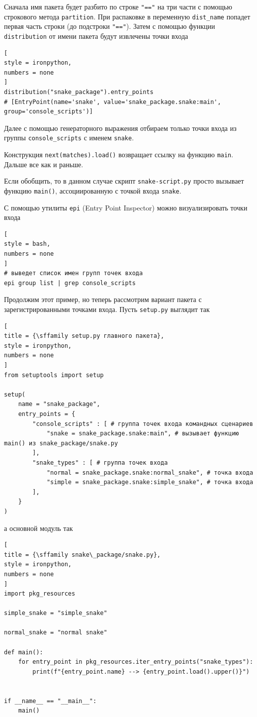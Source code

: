\documentclass[%
	11pt,
	a4paper,
	utf8,
		]{article}
\begin{document}
Сначала имя пакета будет разбито по строке \verb|"=="| на три части с помощью строкового метода \texttt{partition}. При распаковке в переменную \texttt{dist\_name} попадет первая часть строки (до подстроки \verb|"=="|). Затем с помощью функции \texttt{distribution} от имени пакета будут извлечены точки входа
\begin{lstlisting}[
style = ironpython,
numbers = none	
]
distribution("snake_package").entry_points
# [EntryPoint(name='snake', value='snake_package.snake:main', group='console_scripts')]
\end{lstlisting}

Далее с помощью генераторного выражения отбираем только точки входа из группы \texttt{console\_scripts} с именем \texttt{snake}.

Конструкция \texttt{next(matches).load()} возвращает ссылку на функцию \texttt{main}. Дальше все как и раньше.

Если обобщить, то в данном случае скрипт \texttt{snake-script.py} просто вызывает функцию \texttt{main()}, ассоциированную с точкой входа \texttt{snake}.


С помощью утилиты \texttt{epi} (Entry Point Inspector) можно визуализировать точки входа
\begin{lstlisting}[
style = bash,
numbers = none	
]
# выведет список имен групп точек входа
epi group list | grep console_scripts
\end{lstlisting}

Продолжим этот пример, но теперь рассмотрим вариант пакета с зарегистрированными точками входа. Пусть \texttt{setup.py} выглядит так
\begin{lstlisting}[
title = {\sffamily setup.py главного пакета},
style = ironpython,
numbers = none	
]
from setuptools import setup

setup(
    name = "snake_package",
    entry_points = {
	    "console_scripts" : [ # группа точек входа командных сценариев
	        "snake = snake_package.snake:main", # вызывает функцию main() из snake_package/snake.py
	    ],
	    "snake_types" : [ # группа точек входа
	        "normal = snake_package.snake:normal_snake", # точка входа
	        "simple = snake_package.snake:simple_snake", # точка входа
	    ],
    }
)
\end{lstlisting}
а основной модуль так
\begin{lstlisting}[
title = {\sffamily snake\_package/snake.py},
style = ironpython,
numbers = none	
]
import pkg_resources

simple_snake = "simple_snake"

normal_snake = "normal snake"

def main():
    for entry_point in pkg_resources.iter_entry_points("snake_types"):
        print(f"{entry_point.name} --> {entry_point.load().upper()}")


if __name__ == "__main__":
    main()
\end{lstlisting}
\end{document}

